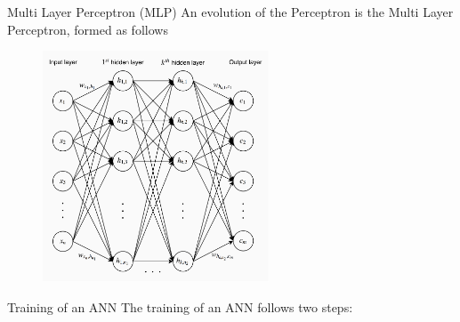 \documentclass[xcolor={usenames}]{beamer}
\begin{document}
  \begin{frame}{Multi Layer Perceptron (MLP)}
  	An evolution of the Perceptron is the Multi Layer Perceptron, formed as follows
  	\begin{figure}[t]
		\centering
		\includegraphics[width=0.6\textwidth]{../figures/multi-layer-perceptron.png}
	\end{figure}	
  \end{frame}
  \begin{frame}{Training of an ANN}
  	The training of an ANN follows two steps:
  	\begin{itemize}
  	\end{itemize}
  \end{frame}
\end{document}
